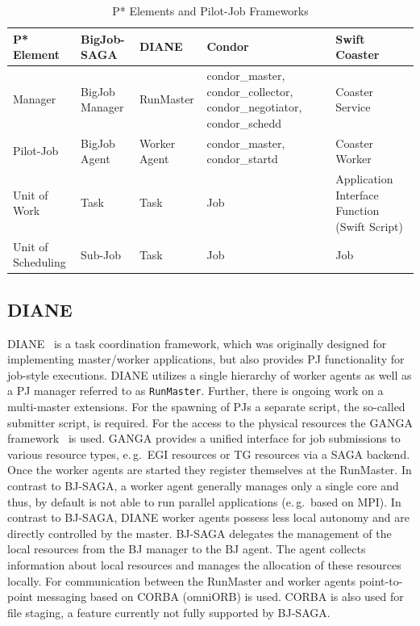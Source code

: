 \documentclass[conference,final]{IEEEtran}
\newcommand{\upp}{\vspace*{-0.5em}}
\begin{document}
\begin{table}[t]
\centering
\begin{tabular}{|p{2.5cm}|p{3cm}|p{3cm}|p{3cm}|p{3cm}|}
\hline
\textbf{P* Element} &\textbf{BigJob-SAGA} &\textbf{DIANE} &\textbf{Condor} 
&\textbf{Swift Coaster}  \\
\hline
Manager &BigJob Manager & RunMaster & condor\_master, condor\_collector, condor\_negotiator, condor\_schedd &Coaster Service\\ 
\hline
Pilot-Job &BigJob Agent  & Worker Agent &condor\_master, condor\_startd &Coaster Worker\\
\hline
Unit of Work &Task &Task &Job &Application Interface Function (Swift Script)\\
\hline
Unit of Scheduling &Sub-Job &Task &Job &Job\\
\hline
\end{tabular}
\caption{P* Elements and Pilot-Job Frameworks} \label{table:bigjob-saga-diane}
\end{table}

\subsection{DIANE\upp\upp}

DIANE~\cite{Moscicki:908910} is a task coordination framework, which was
originally designed for implementing master/worker applications, but also
provides PJ functionality for job-style executions. DIANE utilizes a single
hierarchy of worker agents as well as a PJ manager referred to as
\texttt{RunMaster}. Further, there is ongoing work on a multi-master extensions.
For the spawning of PJs a separate script, the so-called submitter script, is
required. For the access to the physical resources the GANGA 
framework~\cite{DBLP:journals/corr/abs-0902-2685} is used. GANGA
provides a unified interface for job submissions to various resource types,
e.\,g.\ EGI resources or TG resources via a SAGA backend. Once the worker agents
are started they register themselves at the RunMaster. In contrast to BJ-SAGA, a
worker agent generally manages only a single core and thus, by default is not
able to run parallel applications (e.\,g.\ based on MPI). In contrast to
BJ-SAGA, DIANE worker agents possess less local autonomy and are directly
controlled by the master. BJ-SAGA delegates the management of the local
resources from the BJ manager to the BJ agent. The agent collects information
about local resources and manages the allocation of these resources locally. For
communication between the RunMaster and worker agents point-to-point messaging
based on CORBA (omniORB) is used. CORBA is also used for file staging, a feature
currently not fully supported by BJ-SAGA.
\end{document}
